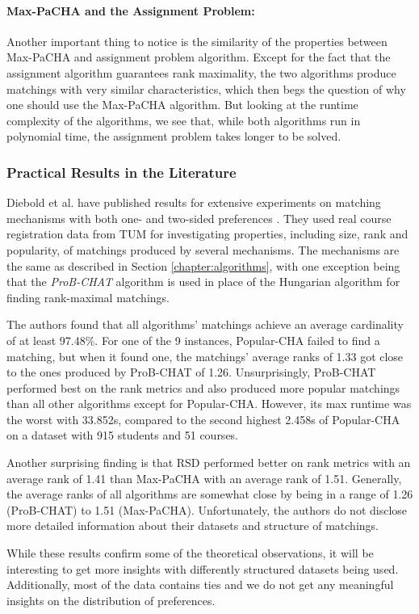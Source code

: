 \paragraph{Max-PaCHA and the Assignment Problem:}
Another important thing to notice is the similarity of the properties between Max-PaCHA and assignment problem algorithm. Except for the fact that the assignment algorithm guarantees rank maximality, the two algorithms produce matchings with very similar characteristics, which then begs the question of why one should use the Max-PaCHA algorithm. But looking at the runtime complexity of the algorithms, we see that, while both algorithms run in polynomial time, the assignment problem takes longer to be solved.

\subsubsection{Practical Results in the Literature}\label{sec:practical-results-lit}
Diebold et al. have published results for extensive experiments on matching mechanisms with both one- and two-sided preferences \cite{DieboldBenchmark}. They used real course registration data from TUM for investigating properties, including size, rank and popularity, of matchings produced by several mechanisms. The mechanisms are the same as described in Section \ref{chapter:algorithms}, with one exception being that the \emph{ProB-CHAT} algorithm \cite{DieboldBenchmark} is used in place of the Hungarian algorithm for finding rank-maximal matchings.

The authors found that all algorithms' matchings achieve an average cardinality of at least 97.48\%. For one of the 9 instances, Popular-CHA failed to find a matching, but when it found one, the matchings' average ranks of 1.33 got close to the ones produced by ProB-CHAT of 1.26. Unsurprisingly, ProB-CHAT performed best on the rank metrics and also produced more popular matchings than all other algorithms except for Popular-CHA. However, its max runtime was the worst with 33.852s, compared to the second highest 2.458s of Popular-CHA on a dataset with 915 students and 51 courses.

Another surprising finding is that RSD performed better on rank metrics with an average rank of 1.41 than Max-PaCHA with an average rank of 1.51. Generally, the average ranks of all algorithms are somewhat close by being in a range of 1.26 (ProB-CHAT) to 1.51 (Max-PaCHA). Unfortunately, the authors do not disclose more detailed information about their datasets and structure of matchings. 

While these results confirm some of the theoretical observations, it will be interesting to get more insights with differently structured datasets being used. Additionally, most of the data contains ties and we do not get any meaningful insights on the distribution of preferences. 
